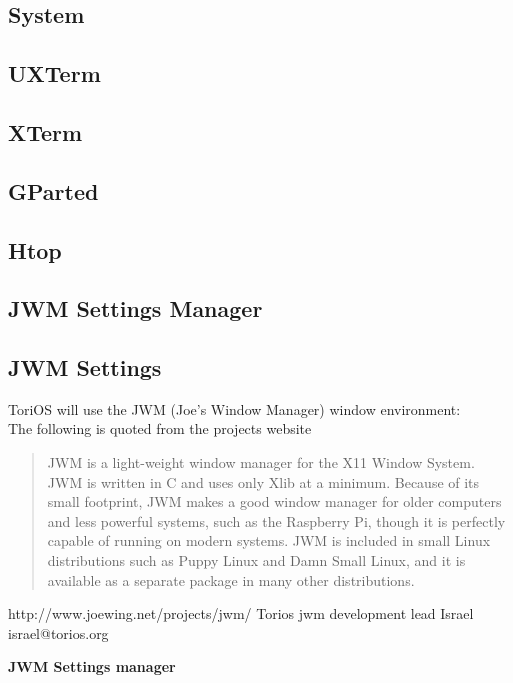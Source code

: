 \documentclass[12pt,a4paper]{book}
\begin{document}
\subsection{System}
\subsection{UXTerm}
\subsection{XTerm}
\subsection{GParted}
\subsection{Htop}

\subsection{JWM Settings Manager}


\subsection{JWM Settings}
ToriOS will use the JWM (Joe's Window Manager) window environment:\\

The following is quoted from the projects website

\begin{quote}
JWM is a light-weight window manager for the X11 Window System. JWM is written in C and uses only Xlib at a minimum. Because of its small footprint, JWM makes a good window manager for older computers and less powerful systems, such as the Raspberry Pi, though it is perfectly capable of running on modern systems. JWM is included in small Linux distributions such as Puppy Linux and Damn Small Linux, and it is available as a separate package in many other distributions. 
\end{quote}
http://www.joewing.net/projects/jwm/
Torios jwm development lead Israel israel@torios.org
\newpage

{\large \textbf{JWM Settings manager}} \\ \\
\end{document}
